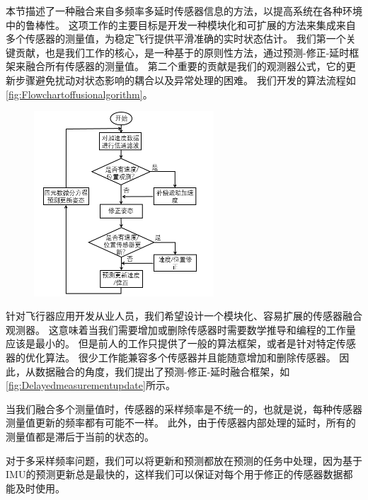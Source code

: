 \documentclass[
  type=master
]{gdutthesis}
\begin{document}
本节描述了一种融合来自多频率多延时传感器信息的方法，以提高系统在各种环境中的鲁棒性。
这项工作的主要目标是开发一种模块化和可扩展的方法来集成来自多个传感器的测量值，为稳定飞行提供平滑准确的实时状态估计。
我们第一个关键贡献，也是我们工作的核心，是一种基于\cite{mahony2008nonlinear}的原则性方法，通过预测-修正-延时框架来融合所有传感器的测量值。
第二个重要的贡献是我们的观测器公式，它的更新步骤避免扰动对状态影响的耦合以及异常处理的困难。
我们开发的算法流程如\autoref{fig:Flowchartoffusionalgorithm}。
\begin{figure}[htbp]
	\centering
	\includegraphics[width=0.6\textwidth]{屏幕截图 2022-03-06 210135.png}
	\label{fig:Flowchartoffusionalgorithm}
\end{figure}

针对飞行器应用开发从业人员，我们希望设计一个模块化、容易扩展的传感器融合观测器。
这意味着当我们需要增加或删除传感器时需要数学推导和编程的工作量应该是最小的。
但是前人的工作只提供了一般的算法框架，或者是针对特定传感器的优化算法。
很少工作能兼容多个传感器并且能随意增加和删除传感器。
因此，从数据融合的角度，我们提出了预测-修正-延时融合框架，如\autoref{fig:Delayedmeasurementupdate}所示。

当我们融合多个测量值时，传感器的采样频率是不统一的，也就是说，每种传感器测量值更新的频率都有可能不一样。
此外，由于传感器内部处理的延时，所有的测量值都是滞后于当前的状态的。

对于多采样频率问题，我们可以将更新和预测都放在预测的任务中处理，因为基于IMU的预测更新总是最快的，这样我们可以保证对每个用于修正的传感器数据都能及时使用。
\end{document}
